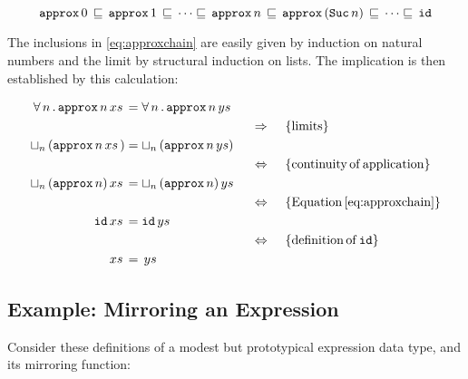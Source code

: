 \begin{equation}
\label{eq:approxchain}
\hs{approx} \, 0 \,
   \sqsubseteq \,
\hs{approx} \, 1 \,
   \sqsubseteq \,
\cdots
   \sqsubseteq \,
\hs{approx} \, n \,
   \sqsubseteq \,
\hs{approx} \, (\hs{Suc} \, n) \,
   \sqsubseteq \,
\cdots
   \sqsubseteq \,
\hs{id}
\end{equation}

The inclusions in \ref{eq:approxchain}
are easily given by induction on
natural numbers and the limit by structural induction on lists. The
implication is then established by this calculation:

\newcommand{\xsys}[2]{#1 \, xs \, #2 & = #1 \, ys #2}
\newcommand{\desca}[1]{  & \hspace{46mm}                              \{ \mathrm{#1} \}}
\newcommand{\descra}[1]{ & \hspace{35mm} \Rightarrow     \hspace{4mm} \{ \mathrm{#1} \}}
\newcommand{\descla}[1]{ & \hspace{35mm} \Leftarrow      \hspace{4mm} \{ \mathrm{#1} \}}
\newcommand{\desclra}[1]{& \hspace{35mm} \Leftrightarrow \hspace{4mm} \{ \mathrm{#1} \}}
\begin{align*}
\xsys{\fa{n} \hs{approx} \, n}{}            \\
\descra{limits}                             \\
\xsys{\lub{n} \, (\hs{approx} \, n}{)}      \\
\desclra{continuity \, of \, application}   \\
\xsys{\lub{n} \, (\hs{approx} \, n)}{}      \\
\desclra{Equation \, \ref{eq:approxchain}} \\
\xsys{\hs{id}}{}                            \\
\desclra{definition \, of \, \hs{id}}       \\
\xsys{}{}                                   \\
\end{align*}

\subsection{Example: Mirroring an Expression}

Consider these definitions of a modest but prototypical expression
data type, and its mirroring function:

